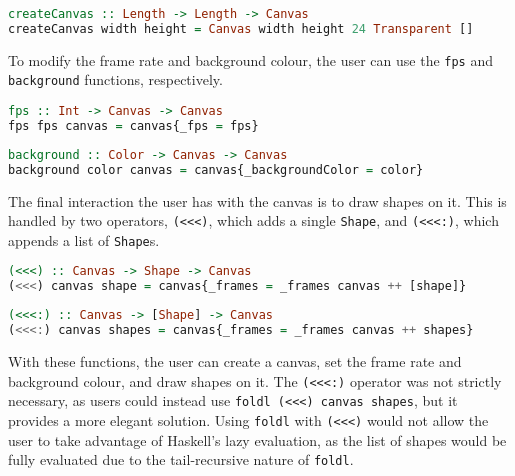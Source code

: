 \documentclass[../main.tex]{subfiles}
\begin{document}
        \begin{lstlisting}[language=Haskell, label={lst:createCanvas}, caption={The createCanvas function.
            Default values are provided for the frame rate, background colour and frames.}]
createCanvas :: Length -> Length -> Canvas
createCanvas width height = Canvas width height 24 Transparent []
        \end{lstlisting}

        To modify the frame rate and background colour, the user can use the \verb|fps|
            and \verb|background| functions, respectively.

        \begin{lstlisting}[language=Haskell, label={lst:fps}, caption={The fps function.}]
fps :: Int -> Canvas -> Canvas
fps fps canvas = canvas{_fps = fps}
        \end{lstlisting}

        \begin{lstlisting}[language=Haskell, label={lst:background}, caption={The background function.}]
background :: Color -> Canvas -> Canvas
background color canvas = canvas{_backgroundColor = color}
        \end{lstlisting}

        The final interaction the user has with the canvas is to draw shapes on it.
        This is handled by two operators, \verb|(<<<)|, which adds a single
            \verb|Shape|, and \verb|(<<<:)|, which appends a list of \verb|Shape|s.

        \begin{lstlisting}[language=Haskell, label={lst:<<<}, caption={The operator to append a single
            frame to the canvas.}]
(<<<) :: Canvas -> Shape -> Canvas
(<<<) canvas shape = canvas{_frames = _frames canvas ++ [shape]}
        \end{lstlisting}

        \begin{lstlisting}[language=Haskell, label={lst:<<<:}, caption={The operator to append an
            entire list of frames to the canvas.}]
(<<<:) :: Canvas -> [Shape] -> Canvas
(<<<:) canvas shapes = canvas{_frames = _frames canvas ++ shapes}
        \end{lstlisting}

        With these functions, the user can create a canvas, set the frame rate and
            background colour, and draw shapes on it.
        The \verb|(<<<:)| operator was not strictly necessary, as users could instead
            use \verb|foldl (<<<) canvas shapes|, but it provides a more elegant solution.
        Using \verb|foldl| with \verb|(<<<)| would not allow the user to take advantage
            of Haskell's lazy evaluation, as the list of shapes would be fully evaluated
            due to the tail-recursive nature of \verb|foldl|.
\end{document}
